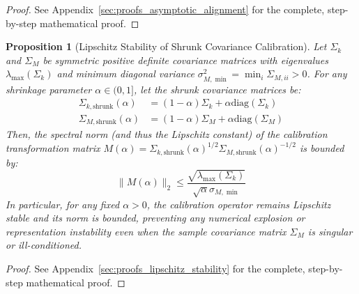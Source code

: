 \documentclass{article}
\theoremstyle{plain}
\newtheorem{proposition}[theorem]{Proposition}
\theoremstyle{definition}
\theoremstyle{remark}
\begin{document}
\begin{proof}
See Appendix~\ref{sec:proofs_asymptotic_alignment} for the complete, step-by-step mathematical proof.
\end{proof}

\begin{proposition}[Lipschitz Stability of Shrunk Covariance Calibration]
Let $\Sigma_k$ and $\Sigma_M$ be symmetric positive definite covariance matrices with eigenvalues $\lambda_{\max}(\Sigma_k)$ and minimum diagonal variance $\sigma_{M,\min}^2 = \min_{i} \Sigma_{M,ii} > 0$. For any shrinkage parameter $\alpha \in (0, 1]$, let the shrunk covariance matrices be:
\begin{align*}
  \Sigma_{k,\text{shrunk}}(\alpha) &= (1 - \alpha) \Sigma_k + \alpha \text{diag}(\Sigma_k) \\
  \Sigma_{M,\text{shrunk}}(\alpha) &= (1 - \alpha) \Sigma_M + \alpha \text{diag}(\Sigma_M)
\end{align*}
Then, the spectral norm (and thus the Lipschitz constant) of the calibration transformation matrix $M(\alpha) = \Sigma_{k,\text{shrunk}}(\alpha)^{1/2} \Sigma_{M,\text{shrunk}}(\alpha)^{-1/2}$ is bounded by:
\begin{equation}
  \| M(\alpha) \|_2 \leq \frac{\sqrt{\lambda_{\max}(\Sigma_k)}}{\sqrt{\alpha} \sigma_{M,\min}}
\end{equation}
In particular, for any fixed $\alpha > 0$, the calibration operator remains Lipschitz stable and its norm is bounded, preventing any numerical explosion or representation instability even when the sample covariance matrix $\Sigma_M$ is singular or ill-conditioned.
\end{proposition}

\begin{proof}
See Appendix~\ref{sec:proofs_lipschitz_stability} for the complete, step-by-step mathematical proof.
\end{proof}
\end{document}
